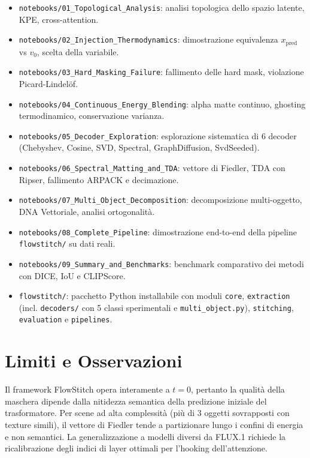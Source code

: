 \documentclass[12pt,a4paper]{report}
\begin{document}
\begin{itemize}
    \item \texttt{notebooks/01\_Topological\_Analysis}: analisi topologica dello spazio latente, KPE, cross-attention.
    \item \texttt{notebooks/02\_Injection\_Thermodynamics}: dimostrazione equivalenza $x_{\text{pred}}$ vs $v_0$, scelta della variabile.
    \item \texttt{notebooks/03\_Hard\_Masking\_Failure}: fallimento delle hard mask, violazione Picard-Lindelöf.
    \item \texttt{notebooks/04\_Continuous\_Energy\_Blending}: alpha matte continuo, ghosting termodinamico, conservazione varianza.
    \item \texttt{notebooks/05\_Decoder\_Exploration}: esplorazione sistematica di 6 decoder (Chebyshev, Cosine, SVD, Spectral, GraphDiffusion, SvdSeeded).
    \item \texttt{notebooks/06\_Spectral\_Matting\_and\_TDA}: vettore di Fiedler, TDA con Ripser, fallimento ARPACK e decimazione.
    \item \texttt{notebooks/07\_Multi\_Object\_Decomposition}: decomposizione multi-oggetto, DNA Vettoriale, analisi ortogonalità.
    \item \texttt{notebooks/08\_Complete\_Pipeline}: dimostrazione end-to-end della pipeline \texttt{flowstitch/} su dati reali.
    \item \texttt{notebooks/09\_Summary\_and\_Benchmarks}: benchmark comparativo dei metodi con DICE, IoU e CLIPScore.
    \item \texttt{flowstitch/}: pacchetto Python installabile con moduli \texttt{core}, \texttt{extraction} (incl. \texttt{decoders/} con 5 classi sperimentali e \texttt{multi\_object.py}), \texttt{stitching}, \texttt{evaluation} e \texttt{pipelines}.
\end{itemize}

\section{Limiti e Osservazioni}

Il framework FlowStitch opera interamente a $t=0$, pertanto la qualità della maschera dipende dalla nitidezza semantica della predizione iniziale del trasformatore. Per scene ad alta complessità (più di 3 oggetti sovrapposti con texture simili), il vettore di Fiedler tende a partizionare lungo i confini di energia e non semantici. La generalizzazione a modelli diversi da FLUX.1 richiede la ricalibrazione degli indici di layer ottimali per l'hooking dell'attenzione.

\newpage


\end{document}
